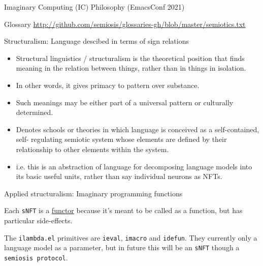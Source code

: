 \documentclass[presentation]{beamer}
\begin{document}
\begin{frame}[label={sec:org7bee3b5},fragile]{Imaginary Computing (IC) Philosophy (EmacsConf 2021)}
 \begin{block}{Glossary}
{\tiny
\url{http://github.com/semiosis/glossaries-gh/blob/master/semiotics.txt}
}
\end{block}

\begin{block}{Structuralism: Language descibed in terms of sign relations}
{\tiny
\begin{itemize}
\item Structural linguistics / structuralism is the theoretical position that finds
meaning in the relation between things, rather than in things in isolation.

\item In other words, it gives primacy to pattern over substance.

\item Such meanings may be either part of a universal pattern or culturally
determined.

\item Denotes schools or theories in which language is conceived as a
self-contained, self- regulating semiotic system whose elements are defined
by their relationship to other elements within the system.

\item i.e. this is an abstraction of language for decomposing language models into its basic useful units, rather than say individual neurons as NFTs.
\end{itemize}
}
\end{block}

\begin{block}{Applied structuralism: Imaginary programming functions}
{\tiny
Each \texttt{sNFT} is a \uline{functor} because it's meant to
be called as a function, but has particular
side-effects.

The \texttt{ilambda.el} primitives are \texttt{ieval}, \texttt{imacro} and \texttt{idefun}. They currently only a language model as a
parameter, but in future this will be an \texttt{sNFT} though a \texttt{semiosis protocol}.
}
\end{block}
\end{frame}
\end{document}
